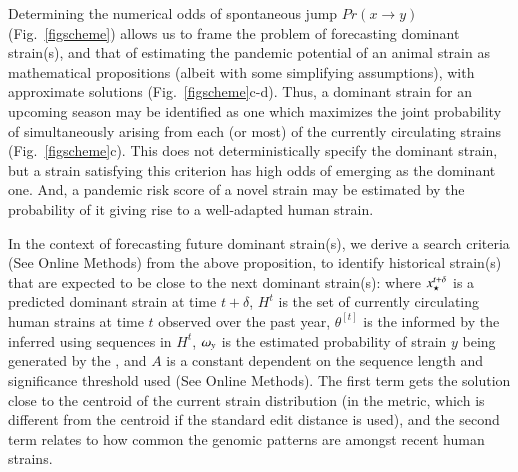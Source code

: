 \documentclass[onecolumn, compsoc,10pt]{IEEEtran}
\def\METHODS{Online Methods\xspace}
\begin{document}
Determining the numerical odds of spontaneous jump $ Pr(x \rightarrow y)$ (Fig.~\ref{figscheme}) allows us to frame the problem of forecasting  dominant strain(s), and that of estimating the  pandemic potential of an animal strain as  mathematical propositions (albeit with some simplifying assumptions), with  approximate solutions (Fig.~\ref{figscheme}c-d). Thus,  a dominant strain for an upcoming  season may be identified as one which maximizes the joint probability of simultaneously arising from each (or most)  of the currently circulating strains (Fig.~\ref{figscheme}c).  This does not deterministically specify the dominant strain, but a strain satisfying this criterion  has  high odds of emerging as the dominant one. And, a pandemic risk score of a novel strain may be estimated by the probability of it giving rise to a well-adapted human strain.  %


In the context of  forecasting  future dominant strain(s),  we derive a search criteria (See \METHODS) from the above proposition, to identify  historical strain(s) that are  expected to be close to the next dominant strain(s):
%
%
where $x_\star^{t+\delta}$ is a predicted dominant strain  at time $t+\delta$, $H^t$ is the set of currently circulating human strains at time $t$  observed over the past year, $\theta^{[t]}$ is the \qdist informed by the inferred \enet using sequences in $H^t$, $\omega_{y}$ is the estimated probability of strain $y$ being generated by the \enet, and $A$ is a constant dependent on the sequence length and significance threshold used (See \METHODS). The first term gets the solution close to the centroid of the current strain distribution (in the \qdist metric, which is different from the centroid if the standard edit distance is used), and the second term relates to how common the genomic patterns are amongst recent human strains. 
\end{document}
